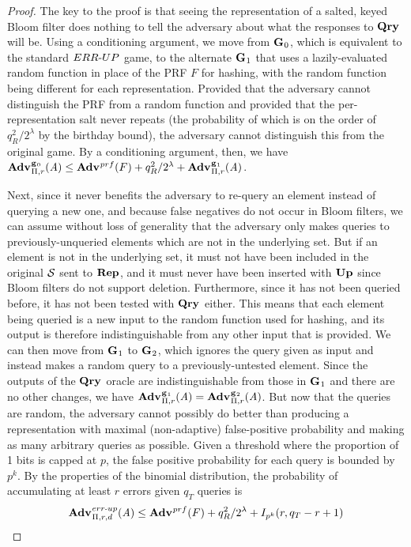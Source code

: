 \begin{proof}

The key to the proof is that seeing the representation of a salted, keyed Bloom
filter does nothing to tell the adversary about what the responses to $\mathbf{Qry}\hspace{0.5pt}$
will be. Using a conditioning argument, we move from $\mathbf{G}\hspace{0.5pt}_0$, which is
equivalent to the standard ${ERR\mbox{-}UP}$ game, to the alternate $\mathbf{G}\hspace{0.5pt}_1$ that uses a
lazily-evaluated random function in place of the PRF $F$ for hashing, with the
random function being different for each representation. Provided that the
adversary cannot distinguish the PRF from a random function and provided that
the per-representation salt never repeats (the probability of which is on the
order of $q_R^2/2^\lambda$ by the birthday bound), the adversary cannot
distinguish this from the original game. By a conditioning argument, then, we
have $\Adv{\game_0}_{\struct,r}(\advA) \le \Adv{\prf}(F) + q_R^2/2^\lambda + \Adv{\game_1}_{\struct,r}(\advA)$.

Next, since it never benefits the adversary to re-query an element instead of
querying a new one, and because false negatives do not occur in Bloom filters,
we can assume without loss of generality that the adversary only makes queries
to previously-unqueried elements which are not in the underlying set. But if an
element is not in the underlying set, it must not have been included in the
original $\mathcal{S}$ sent to $\mathbf{Rep}\hspace{0.5pt}$, and it must never have been inserted with
$\mathbf{Up}\hspace{0.5pt}$ since Bloom filters do not support deletion. Furthermore, since it has
not been queried before, it has not been tested with $\mathbf{Qry}\hspace{0.5pt}$ either. This means
that each element being queried is a new input to the random function used for
hashing, and its output is therefore indistinguishable from any other input that
is provided. We can then move from $\mathbf{G}\hspace{0.5pt}_1$ to $\mathbf{G}\hspace{0.5pt}_2$, which ignores the
query given as input and instead makes a random query to a previously-untested
element. Since the outputs of the $\mathbf{Qry}\hspace{0.5pt}$ oracle are indistinguishable from
those in $\mathbf{G}\hspace{0.5pt}_1$ and there are no other changes, we have
$\Adv{\game_1}_{\struct,r}(\advA) = \Adv{\game_2}_{\struct,r}(\advA)$. But now
that the queries are random, the adversary cannot possibly do better than
producing a representation with maximal (non-adaptive) false-positive
probability and making as many arbitrary queries as possible. Given a threshold
where the proportion of 1 bits is capped at $p$, the false positive probability
for each query is bounded by $p^k$. By the properties of the binomial
distribution, the probability of accumulating at least $r$ errors given $q_T$
queries is
$$\Adv{\errep}_{\struct,r,d}(\advA) \le \Adv{\prf}(F) + q_R^2/2^\lambda + I_{p^k}(r, q_T-r+1)$$

\end{proof}

